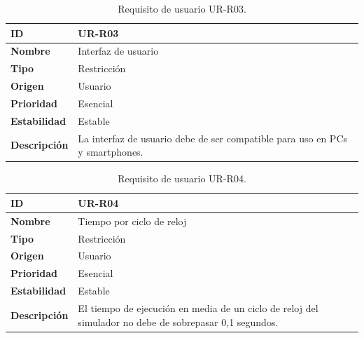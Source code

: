 \begin{center}
\begin{table}[htbp]
\centering
\caption{Requisito de usuario UR-R03.}
\begin{tabular}{@{}p{2.5cm} p{9cm}@{}} 
\toprule
\textbf{ID} 				& UR-R03 \\
\midrule
\textbf{Nombre} 			& Interfaz de usuario \\
\midrule
\textbf{Tipo} 			& Restricción \\
\midrule
\textbf{Origen} 			& Usuario \\
\midrule
\textbf{Prioridad}		& Esencial \\
\midrule
\textbf{Estabilidad} 		& Estable \\
\midrule
\textbf{Descripción} 	& La interfaz de usuario debe de ser compatible para uso en PCs y smartphones. \\
\bottomrule
\end{tabular}
\label{tab:urr03}
\end{table}
\end{center}

\begin{center}
\begin{table}[htbp]
\centering
\caption{Requisito de usuario UR-R04.}
\begin{tabular}{@{}p{2.5cm} p{9cm}@{}} 
\toprule
\textbf{ID} 				& UR-R04 \\
\midrule
\textbf{Nombre} 			& Tiempo por ciclo de reloj \\
\midrule
\textbf{Tipo} 			& Restricción \\
\midrule
\textbf{Origen} 			& Usuario \\
\midrule
\textbf{Prioridad}		& Esencial \\
\midrule
\textbf{Estabilidad} 		& Estable \\
\midrule
\textbf{Descripción} 	& El tiempo de ejecución en media de un ciclo de reloj del simulador no debe de sobrepasar 0,1 segundos. \\
\bottomrule
\end{tabular}
\label{tab:urr04}
\end{table}
\end{center}

